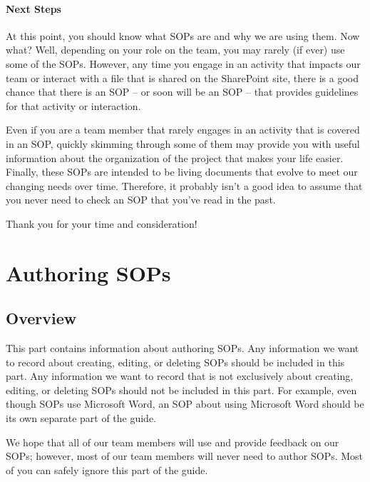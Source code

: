 \documentclass[
  letterpaper,
  DIV=11,
  numbers=noendperiod]{scrreprt}
\begin{document}
\subsection{Next Steps}\label{next-steps}

At this point, you should know what SOPs are and why we are using them.
Now what? Well, depending on your role on the team, you may rarely (if
ever) use some of the SOPs. However, any time you engage in an activity
that impacts our team or interact with a file that is shared on the
SharePoint site, there is a good chance that there is an SOP -- or soon
will be an SOP -- that provides guidelines for that activity or
interaction.

Even if you are a team member that rarely engages in an activity that is
covered in an SOP, quickly skimming through some of them may provide you
with useful information about the organization of the project that makes
your life easier.\\
Finally, these SOPs are intended to be living documents that evolve to
meet our changing needs over time. Therefore, it probably isn't a good
idea to assume that you never need to check an SOP that you've read in
the past.

Thank you for your time and consideration!

\part{Authoring SOPs}

\chapter{Overview}\label{sec-as_overview}

This part contains information about authoring SOPs. Any information we
want to record about creating, editing, or deleting SOPs should be
included in this part. Any information we want to record that is not
exclusively about creating, editing, or deleting SOPs should not be
included in this part. For example, even though SOPs use Microsoft Word,
an SOP about using Microsoft Word should be its own separate part of the
guide.

\begin{tcolorbox}[enhanced jigsaw, leftrule=.75mm, bottomrule=.15mm, toprule=.15mm, coltitle=black, title=\textcolor{quarto-callout-note-color}{\faInfo}\hspace{0.5em}{Note}, left=2mm, colback=white, opacityback=0, colbacktitle=quarto-callout-note-color!10!white, rightrule=.15mm, toptitle=1mm, breakable, bottomtitle=1mm, titlerule=0mm, arc=.35mm, opacitybacktitle=0.6, colframe=quarto-callout-note-color-frame]

We hope that all of our team members will use and provide feedback on
our SOPs; however, most of our team members will never need to author
SOPs. Most of you can safely ignore this part of the guide.

\end{tcolorbox}
\end{document}
